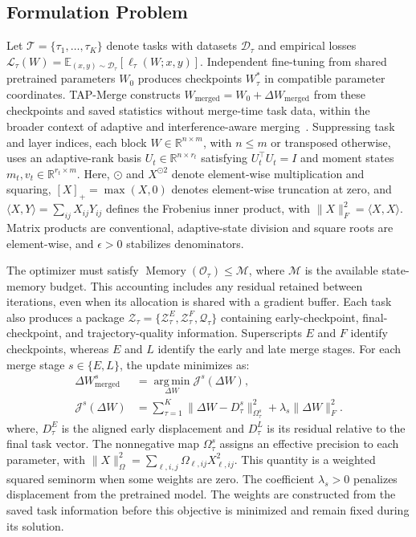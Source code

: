 \documentclass[fleqn,10pt]{wlscirep}
\begin{document}
\subsection{Formulation Problem}
\label{subsec:framework_overview}
Let $\mathcal{T}=\{\tau_1,\ldots,\tau_K\}$ denote tasks with datasets $\mathcal{D}_{\tau}$ and empirical losses $\mathcal{L}_{\tau}(W)=\mathbb{E}_{(x,y)\sim\mathcal{D}_{\tau}}[\ell_{\tau}(W;x,y)]$. Independent fine-tuning from shared pretrained parameters $W_0$ produces checkpoints $W_{\tau}^{*}$ in compatible parameter coordinates. TAP-Merge constructs $W_{\mathrm{merged}}=W_0+\Delta W_{\mathrm{merged}}$ from these checkpoints and saved statistics without merge-time task data, within the broader context of adaptive and interference-aware merging~\cite{adamerging2024,wudi2025,apgdmerging2025}. Suppressing task and layer indices, each block $W\in\mathbb{R}^{n\times m}$, with $n\leq m$ or transposed otherwise, uses an adaptive-rank basis $U_t\in\mathbb{R}^{n\times r_t}$ satisfying $U_t^\top U_t=I$ and moment states $m_t,v_t\in\mathbb{R}^{r_t\times m}$. Here, $\odot$ and $X^{\odot2}$ denote element-wise multiplication and squaring, $[X]_+=\max(X,0)$ denotes element-wise truncation at zero, and $\langle X,Y\rangle=\sum_{ij}X_{ij}Y_{ij}$ defines the Frobenius inner product, with $\|X\|_F^2=\langle X,X\rangle$. Matrix products are conventional, adaptive-state division and square roots are element-wise, and $\epsilon>0$ stabilizes denominators.

The optimizer must satisfy $\operatorname{Memory}(\mathcal{O}_{\tau}) \leq\mathcal{M}$, where $\mathcal{M}$ is the available state-memory budget. This accounting includes any residual retained between iterations, even when its allocation is shared with a gradient buffer. Each task also produces a package $\mathcal{Z}_{\tau}=\{\mathcal{Z}_{\tau}^{E}, \mathcal{Z}_{\tau}^{F},\mathcal{Q}_{\tau}\}$ containing early-checkpoint, final-checkpoint, and trajectory-quality information. Superscripts $E$ and $F$ identify checkpoints, whereas $E$ and $L$ identify the early and late merge stages. For each merge stage $s\in\{E,L\}$, the update minimizes as:
\begin{equation}
\begin{aligned}
\Delta W_{\mathrm{merged}}^{s}
&=\operatorname*{arg\,min}_{\Delta W}\mathcal{J}^{s}(\Delta W),\\
\mathcal{J}^{s}(\Delta W)
&=\sum_{\tau=1}^{K}\|\Delta W-D_{\tau}^{s}\|_{\Omega_{\tau}^{s}}^{2}
 +\lambda_s\|\Delta W\|_F^2.
\end{aligned}
\label{eq:dual_stage_objective}
\end{equation}
where, $D_{\tau}^{E}$ is the aligned early displacement and $D_{\tau}^{L}$ is its residual relative to the final task vector. The nonnegative map $\Omega_{\tau}^{s}$ assigns an effective precision to each parameter, with $\|X\|_{\Omega}^{2}=\sum_{\ell,i,j}\Omega_{\ell,ij}X_{\ell,ij}^{2}$. This quantity is a weighted squared seminorm when some weights are zero. The coefficient $\lambda_s>0$ penalizes displacement from the pretrained model. The weights are constructed from the saved task information before this objective is minimized and remain fixed during its solution.
\end{document}

